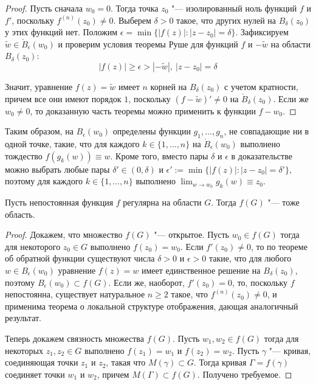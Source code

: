 \begin{proof}
	Пусть сначала $w_0 = 0$. Тогда точка $z_0$ "--- изолированный ноль функций $f$ и $f'$, поскольку $f^{(n)}(z_0) \ne 0$. Выберем $\delta > 0$ такое, что других нулей на $B_\delta(z_0)$ у этих функций нет. Положим $\epsilon = \min\{|f(z)| : |z - z_0| = \delta\}$. Зафиксируем $\widetilde w \in \mathring B_\epsilon(w_0)$ и проверим условия теоремы Руше для функций $f$ и $-\widetilde{w}$ на области $B_\delta(z_0)$:
	\[|f(z)| \ge \epsilon > |-\widetilde{w}|,~|z - z_0| = \delta\]
	
	Значит, уравнение $f(z) = \widetilde w$ имеет $n$ корней на $B_\delta(z_0)$ с учетом кратности, причем все они имеют порядок $1$, поскольку $(f- \widetilde w)' \ne 0$ на $\mathring B_\delta(z_0)$. Если же $w_0 \ne 0$, то доказанную часть теоремы можно применить к функции $f - w_0$.
\end{proof}

\begin{note}
	Таким образом, на $B_\epsilon(w_0)$ определены функции $g_1, \dotsc, g_n$, не совпадающие ни в одной точке, такие, что для каждого $k \in \{1, \dotsc, n\}$ на $\mathring B_\epsilon(w_0)$ выполнено тождество $f(g_k(w)) \equiv w$. Кроме того, вместо пары $\delta$ и $\epsilon$ в доказательстве можно выбрать любые пары $\delta' \in (0, \delta)$ и $\epsilon' := \min\{|f(z)| : |z - z_0| = \delta'\}$, поэтому для каждого $k \in \{1, \dotsc, n\}$ выполнено $\lim_{w \to w_0}g_k(w) \equiv z_0$.
\end{note}

\begin{theorem}
	Пусть непостоянная функция $f$ регулярна на области $G$. Тогда $f(G)$ "--- тоже область.
\end{theorem}

\begin{proof}
	Докажем, что множество $f(G)$ "--- открытое. Пусть $w_0 \in f(G)$ тогда для некоторого $z_0 \in G$ выполнено $f(z_0) = w_0$. Если $f'(z_0) \ne 0$, то по теореме об обратной функции существуют числа $\delta > 0$ и $\epsilon > 0$ такие, что для любого $w \in B_\epsilon(w_0)$ уравнение $f(z) = w$ имеет единственное решение на $B_\delta(z_0)$, поэтому $B_\epsilon(w_0) \subset f(G)$. Если же, наоборот, $f'(z_0) = 0$, то, поскольку $f$ непостоянна, существует натуральное $n \ge 2$ такое, что $f^{(n)}(z_0) \ne 0$, и применима теорема о локальной структуре отображения, дающая аналогичный результат.
	
	Теперь докажем связность множества $f(G)$. Пусть $w_1, w_2 \in f(G)$ тогда для некоторых $z_1, z_2 \in G$ выполнено $f(z_1) = w_1$ и $f(z_2) = w_2$. Пусть $\gamma$ "--- кривая, соединяющая точки $z_1$ и $z_2$, такая что $M(\gamma) \subset G$. Тогда кривая $\Gamma = f(\gamma)$ соединяет точки $w_1$ и $w_2$, причем $M(\Gamma) \subset f(G)$. Получено требуемое.
\end{proof}

